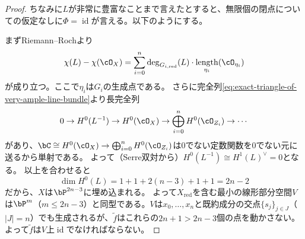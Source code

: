 \documentclass[uplatex, a4paper, dvipdfmx]{jsarticle}
\theoremstyle{definition}
\DeclareMathOperator{\Hom}{\mathrm{Hom}}
\DeclareMathOperator{\id}{\mathrm{id}}
\DeclareMathOperator{\Ker}{\mathrm{Ker}}
\DeclareMathOperator{\Ext}{\mathrm{Ext}}
\DeclareMathOperator{\red}{\mathrm{red}}
\DeclareMathOperator{\length}{\mathrm{length}}
\begin{document}
\begin{proof}
    ちなみに$L$が非常に豊富なことまで言えたとすると、無限個の閉点についての仮定なしに$\Phi = \id$が言える。以下のようにする。

    まずRiemann--Rochより
    \begin{equation}
        \chi(L) - \chi(\cO_X) = \sum_{i=0}^n \deg_{G_{i,\red}}(L) \cdot \length_{\eta_i}(\cO_{\eta_i})
    \end{equation}
    が成り立つ。ここで$\eta_i$は$G_i$の生成点である。
    さらに完全列\eqref{eq:exact-triangle-of-very-ample-line-bundle}より長完全列
    \begin{equation}
        0 \to H^0(L^{-1}) \to H^0(\cO_X) \to \bigoplus_{i=0}^n H^0(\cO_{Z_i}) \to \cdots
    \end{equation}
    があり、$\bC \cong H^0(\cO_X) \to \bigoplus_{i=0}^n H^0(\cO_{Z_i})$は$0$でない定数関数を$0$でない元に送るから単射である。
    よって（Serre双対から）$H^0(L^{-1}) \cong H^1(L)^\vee = 0$となる。
    以上を合わせると
    \begin{equation}
        \dim H^0(L) = 1 + 1 + 2(n-3) + 1 + 1 = 2n-2
    \end{equation}
    だから、$X$は$\bP^{2n-3}$に埋め込まれる。
    よって$X_{\red}$を含む最小の線形部分空間$V$は$\bP^{m}$（$m \leq 2n-3$）と同型である。$V$は$x_0, \dots, x_n$と既約成分の交点$\{s_j\}_{j \in J}$（$|J| = n$）でも生成されるが、$\widetilde{f}$はこれらの$2n+1 >2n-3$個の点を動かさない。よって$\widetilde{f}$は$V$上$\id$でなければならない。


\end{proof}
\end{document}
